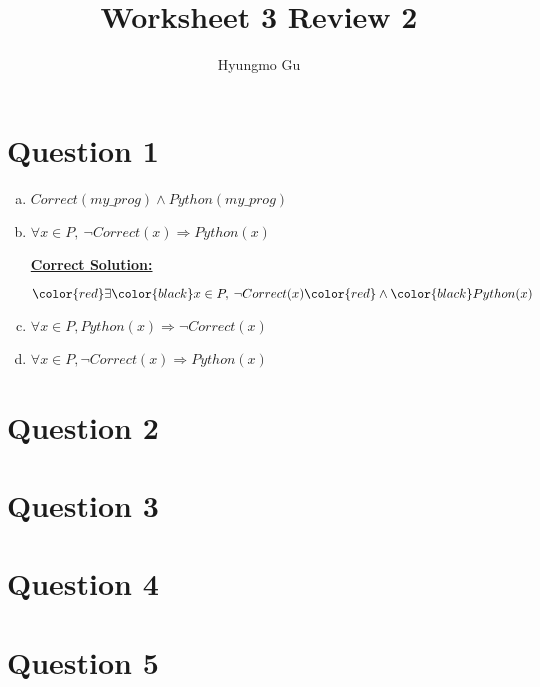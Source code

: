 \documentclass[12pt]{article}
\begin{document}
\title{Worksheet 3 Review 2}
\author{Hyungmo Gu}
\maketitle

\section*{Question 1}
\begin{enumerate}[a.]
    \item $Correct(my\_prog) \land Python(my\_prog)$
    \item

    $\forall x \in P,\: \neg Correct(x) \Rightarrow Python(x)$

    \begin{mdframed}
        \underline{\textbf{Correct Solution:}}

        $\color{red}\exists\color{black} x \in P,\: \neg Correct(x) \color{red}\land\color{black} Python(x)$
    \end{mdframed}

    \item $\forall x \in P, Python(x) \Rightarrow \neg Correct(x)$
    \item $\forall x \in P, \neg Correct(x) \Rightarrow Python(x)$
\end{enumerate}

\section*{Question 2}

\section*{Question 3}

\section*{Question 4}

\section*{Question 5}
\end{document}
